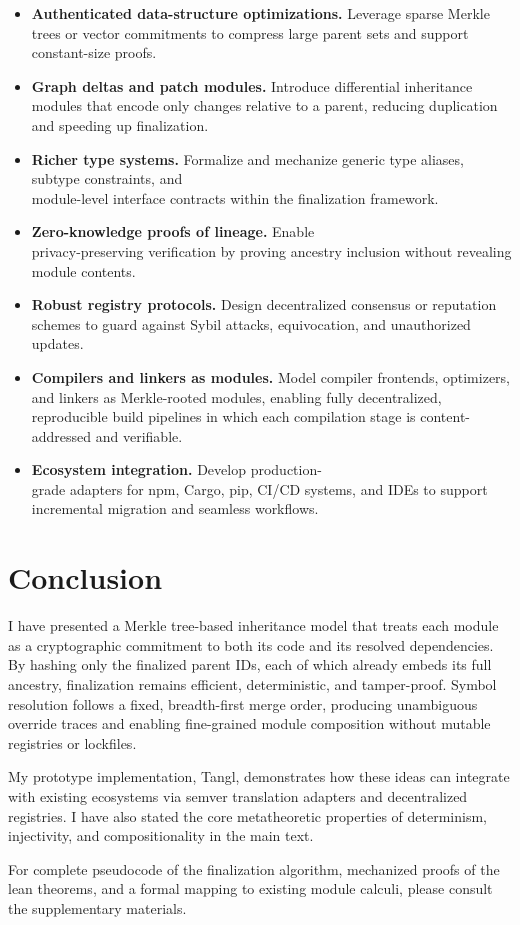 \documentclass[sigplan,screen]{acmart}
\begin{document}
\begin{itemize}
	\item \textbf{Authenticated data-structure optimizations.}
	Leverage sparse Merkle trees or vector commitments to compress large parent sets and support constant-size proofs.
	\item \textbf{Graph deltas and patch modules.}
	Introduce differential inheritance modules that encode only changes relative to a parent, reducing duplication and speeding up finalization.
	\item \textbf{Richer type systems.}
	Formalize and mechanize generic type aliases, subtype constraints, and \\module-level interface contracts within the finalization framework.
	\item \textbf{Zero-knowledge proofs of lineage.} 
	Enable \\privacy-preserving verification by proving ancestry inclusion without revealing module contents.
	\item \textbf{Robust registry protocols.} 
	Design decentralized consensus or reputation schemes to guard against Sybil attacks, equivocation, and unauthorized updates.
	\item \textbf{Compilers and linkers as modules.} 
	Model compiler frontends, optimizers, and linkers as Merkle-rooted modules, enabling fully decentralized, reproducible build pipelines in which each compilation stage is content-addressed and verifiable.
	\item \textbf{Ecosystem integration.} 
	Develop production-\\grade adapters for npm, Cargo, pip, CI/CD systems, and IDEs to support incremental migration and seamless workflows.
\end{itemize}

\section{Conclusion}
\label{sec:conclusion}

I have presented a Merkle tree-based inheritance model that treats each module as a cryptographic commitment to both its code and its resolved dependencies. By hashing only the finalized parent IDs, each of which already embeds its full ancestry, finalization remains efficient, deterministic, and tamper-proof. Symbol resolution follows a fixed, breadth-first merge order, producing unambiguous override traces and enabling fine-grained module composition without mutable registries or lockfiles.

My prototype implementation, Tangl, demonstrates how these ideas can integrate with existing ecosystems via semver translation adapters and decentralized registries. I have also stated the core metatheoretic properties of determinism, injectivity, and compositionality in the main text.

For complete pseudocode of the finalization algorithm, mechanized proofs of the lean theorems, and a formal mapping to existing module calculi, please consult the supplementary materials.

\balance




\end{document}
